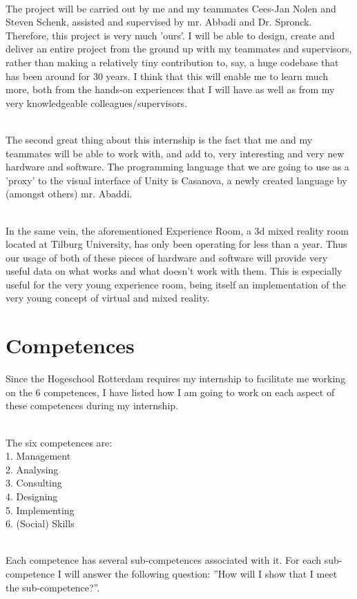 \documentclass[11pt]{article}
\begin{document}
~\\
The project will be carried out by me and my teammates Cees-Jan Nolen and Steven
Schenk, assisted and supervised by mr. Abbadi and Dr. Spronck. Therefore, this project
is very much ’ours’. I will be able to design, create and deliver an entire project from
the ground up with my teammates and supervisors, rather than making a relatively tiny
contribution to, say, a huge codebase that has been around for 30 years. I think that
this will enable me to learn much more, both from the hands-on experiences that I will
have as well as from my very knowledgeable colleagues/supervisors.

~\\
The second great thing about this internship is the fact that me and my teammates will
be able to work with, and add to, very interesting and very new hardware and software.
The programming language that we are going to use as a ’proxy’ to the visual interface
of Unity is Casanova, a newly created language by (amongst others) mr. Abaddi.

~\\
In the same vein, the aforementioned Experience Room, a 3d mixed reality room located at
Tilburg University, has only been operating for less than a year. Thus our usage of both
of these pieces of hardware and software will provide very useful data on what works and
what doesn’t work with them. This is especially useful for the very young experience
room, being itself an implementation of the very young concept of virtual and mixed
reality.

\newpage
\section{Competences}
Since the Hogeschool Rotterdam requires my internship to facilitate me working on the
6 competences, I have listed how I am going to work on each aspect of these competences
during my internship.

~\\
The six competences are:
~\\
1. Management
~\\
2. Analysing
~\\
3. Consulting
~\\
4. Designing
~\\
5. Implementing
~\\
6. (Social) Skills

~\\
Each competence has several sub-competences associated with it. For each sub-competence
I will answer the following question: ”How will I show that I meet the sub-competence?”.
\end{document}
